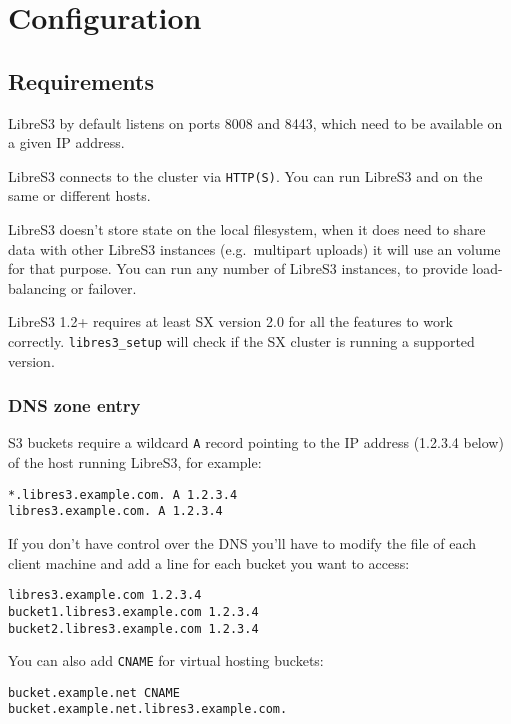 \chapter{Configuration}

\section{Requirements}

LibreS3 by default listens on ports 8008 and 8443, which need to be available on a given
IP address.

LibreS3 connects to the \SX cluster via \verb|HTTP(S)|. You can run LibreS3 and \SX
on the same or different hosts.

LibreS3 doesn't store state on the local filesystem, when it does need to share
data with other LibreS3 instances (e.g.\ multipart uploads) it will use an \SX
volume for that purpose.
You can run any number of LibreS3 instances, to provide load-balancing or
failover.

LibreS3 1.2+ requires at least SX version 2.0 for all the features to work
correctly. \verb|libres3_setup| will check if the SX cluster is running
a supported version.

\subsection{DNS zone entry}
\label{sec:dnszone}

S3 buckets require a wildcard \verb|A| record pointing to the IP address (1.2.3.4 below) of the
host running LibreS3, for example:

\begin{lstlisting}
*.libres3.example.com. A 1.2.3.4
libres3.example.com. A 1.2.3.4
\end{lstlisting}

If you don't have control over the DNS you'll have to modify the  file
of each client machine and add a line for each bucket you want to access:

\begin{lstlisting}
libres3.example.com 1.2.3.4
bucket1.libres3.example.com 1.2.3.4
bucket2.libres3.example.com 1.2.3.4
\end{lstlisting}

You can also add \verb|CNAME| for virtual hosting buckets:
\begin{lstlisting}
bucket.example.net CNAME        bucket.example.net.libres3.example.com.
\end{lstlisting}

